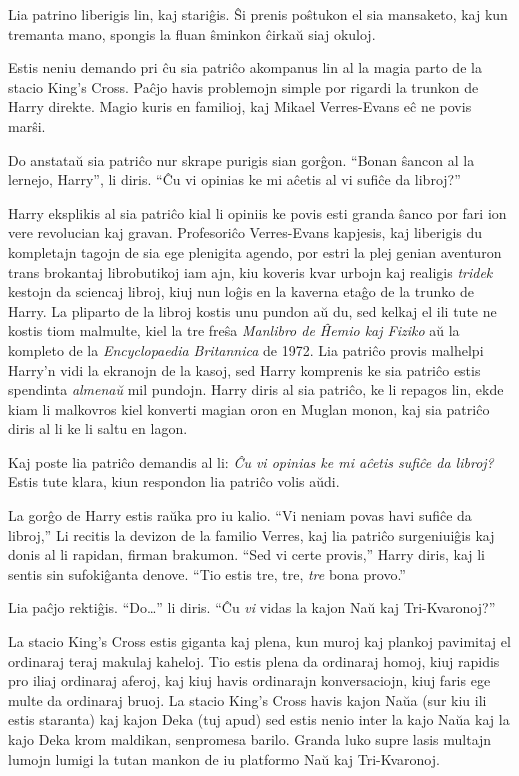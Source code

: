 Lia patrino liberigis lin, kaj stariĝis. Ŝi prenis poŝtukon el sia
mansaketo, kaj kun tremanta mano, spongis la fluan ŝminkon ĉirkaŭ siaj
okuloj.

Estis neniu demando pri ĉu sia patriĉo akompanus lin al la magia parto
de la stacio King's Cross. Paĉjo havis problemojn simple por rigardi
la trunkon de Harry direkte. Magio kuris en familioj, kaj Mikael
Verres-Evans eĉ ne povis marŝi.

Do anstataŭ sia patriĉo nur skrape purigis sian gorĝon.  ``Bonan
ŝancon al la lernejo, Harry'', li diris. ``Ĉu vi opinias ke mi aĉetis
al vi sufiĉe da libroj?''

Harry eksplikis al sia patriĉo kial li opiniis ke povis esti granda
ŝanco por fari ion vere revolucian kaj gravan. Profesoriĉo
Verres-Evans kapjesis, kaj liberigis du kompletajn tagojn de sia ege
plenigita agendo, por estri la plej genian aventuron trans brokantaj
librobutikoj iam ajn, kiu koveris kvar urbojn kaj realigis
\emph{tridek} kestojn da sciencaj libroj, kiuj nun loĝis en la kaverna
etaĝo de la trunko de Harry. La pliparto de la libroj kostis unu
pundon aŭ du, sed kelkaj el ili tute ne kostis tiom malmulte, kiel la
tre freŝa \emph{Manlibro de Ĥemio kaj Fiziko} aŭ la kompleto de la
\emph{Encyclopaedia Britannica} de 1972. Lia patriĉo provis malhelpi
Harry'n vidi la ekranojn de la kasoj, sed Harry komprenis ke sia
patriĉo estis spendinta \emph{almenaŭ} mil pundojn. Harry diris al sia
patriĉo, ke li repagos lin, ekde kiam li malkovros kiel konverti
magian oron en Muglan monon, kaj sia patriĉo diris al li ke li saltu
en lagon.

Kaj poste lia patriĉo demandis al li: \emph{Ĉu vi opinias ke mi aĉetis
sufiĉe da libroj?} Estis tute klara, kiun respondon lia patriĉo volis
aŭdi.

La gorĝo de Harry estis raŭka pro iu kalio. ``Vi neniam povas havi
sufiĉe da libroj,'' Li recitis la devizon de la familio Verres, kaj
lia patriĉo surgeniuiĝis kaj donis al li rapidan, firman
brakumon. ``Sed vi certe provis,'' Harry diris, kaj li sentis sin
sufokiĝanta denove. ``Tio estis tre, tre, \emph{tre} bona provo.''

Lia paĉjo rektiĝis. ``Do\ldots'' li diris. ``Ĉu \emph{vi} vidas la kajon
Naŭ kaj Tri-Kvaronoj?''

La stacio King's Cross estis giganta kaj plena, kun muroj kaj plankoj
pavimitaj el ordinaraj teraj makulaj kaheloj. Tio estis plena da
ordinaraj homoj, kiuj rapidis pro iliaj ordinaraj aferoj, kaj kiuj
havis ordinarajn konversaciojn, kiuj faris ege multe da ordinaraj
bruoj. La stacio King's Cross havis kajon Naŭa (sur kiu ili estis
staranta) kaj kajon Deka (tuj apud) sed estis nenio inter la kajo Naŭa
kaj la kajo Deka krom maldikan, senpromesa barilo. Granda luko supre
lasis multajn lumojn lumigi la tutan mankon de iu platformo Naŭ kaj
Tri-Kvaronoj.

